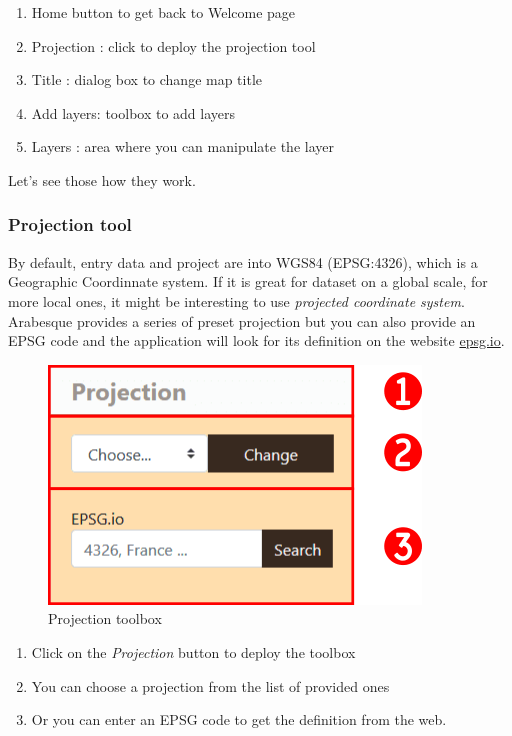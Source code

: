 \documentclass[]{book}
\providecommand{\tightlist}{%
  \setlength{\itemsep}{0pt}\setlength{\parskip}{0pt}}
\begin{document}
\begin{enumerate}
\def\labelenumi{\arabic{enumi}.}
\tightlist
\item
  Home button to get back to Welcome page
\item
  Projection : click to deploy the projection tool
\item
  Title : dialog box to change map title
\item
  Add layers: toolbox to add layers
\item
  Layers : area where you can manipulate the layer
\end{enumerate}

Let's see those how they work.

\hypertarget{projection-tool}{%
\subsubsection{Projection tool}\label{projection-tool}}

By default, entry data and project are into WGS84 (EPSG:4326), which is a Geographic Coordinnate system.
If it is great for dataset on a global scale, for more local ones, it might be
interesting to use \emph{projected coordinate system}.
Arabesque provides a series of preset projection but you can also provide an
EPSG code and the application will look for its definition on the website \href{https://epsg.io}{epsg.io}.

\begin{figure}
\centering
\includegraphics{images/functions/05_functions_swiss_example_projection_tool.png}
\caption{Projection toolbox}
\end{figure}

\begin{enumerate}
\def\labelenumi{\arabic{enumi}.}
\tightlist
\item
  Click on the \emph{Projection} button to deploy the toolbox
\item
  You can choose a projection from the list of provided ones
\item
  Or you can enter an EPSG code to get the definition from the web.
\end{enumerate}
\end{document}
